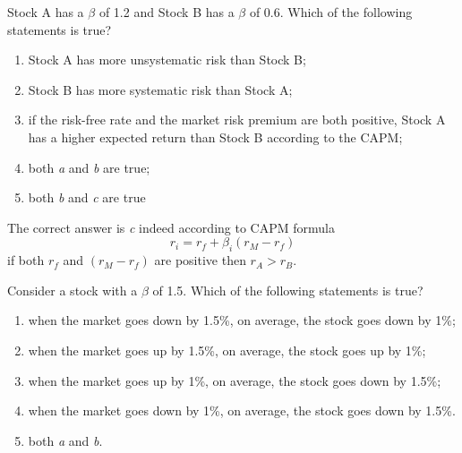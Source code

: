 %
%

\begin{question}
Stock A has a $\beta$ of 1.2 and Stock B has a $\beta$ of 0.6. Which of the following statements is true? 
\begin{enumerate}[label=\emph{\alph*})]
\tightlist
\item Stock A has more unsystematic risk than Stock B;
\item Stock B has more systematic risk than Stock A; 
\item if the risk-free rate and the market risk premium are both positive, Stock A has a higher expected return than Stock B according to the CAPM;
\item both \emph{a} and \emph{b} are true;
\item both \emph{b} and \emph{c} are true
\end{enumerate}
\end{question}

\begin{solution}
The correct answer is \emph{c} indeed according to CAPM formula
\[r_i = r_f + \beta_i (r_M - r_f)\]
if both $r_f$ and $(r_M - r_f)$ are positive then $r_A > r_B$.
\end{solution}	

\begin{question}
Consider a stock with a $\beta$ of 1.5. Which of the following statements is true?

\begin{enumerate}[label=\emph{\alph*}]
\tightlist
\item when the market goes down by 1.5\%, on average, the stock goes down by 1\%;
\item when the market goes up by 1.5\%, on average, the stock goes up by 1\%;
\item when the market goes up by 1\%, on average, the stock goes down by 1.5\%;
\item when the market goes down by 1\%, on average, the stock goes down by 1.5\%. 
\item both \emph{a} and \emph{b}.	
\end{enumerate}
\end{question}

